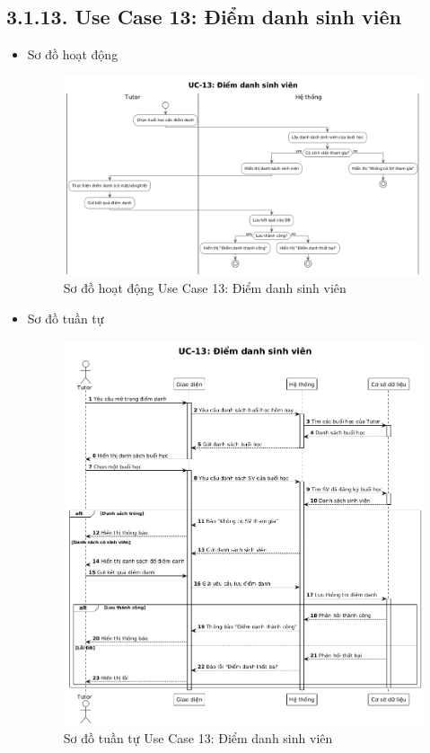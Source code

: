 \subsection*{3.1.13. Use Case 13: Điểm danh sinh viên}
\begin{itemize}
    \item Sơ đồ hoạt động
    \begin{figure}[H]
    \centering
    \includegraphics[scale=0.35 ]{Picture/ACUC13.png}
    \caption{Sơ đồ hoạt động Use Case 13: Điểm danh sinh viên}
    \end{figure}
    \item Sơ đồ tuần tự
    \begin{figure}[H]
    \centering
    \includegraphics[scale=0.35 ]{Picture/SEUC13.png}
    \caption{Sơ đồ tuần tự Use Case 13: Điểm danh sinh viên}
    \end{figure}
\end{itemize}
